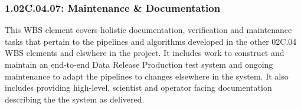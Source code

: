 \subsubsection{1.02C.04.07: Maintenance \& Documentation}

This WBS element covers holistic documentation, verification and
maintenance tasks that pertain to the pipelines and algorithms developed
in the other 02C.04 WBS elements and elswhere in the project. It
includes work to construct and maintain an end-to-end Data Release
Production test system and ongoing maintenance to adapt the pipelines to
changes elsewhere in the system. It also includes providing high-level,
scientist and operator facing documentation describing the the system as
delivered.
